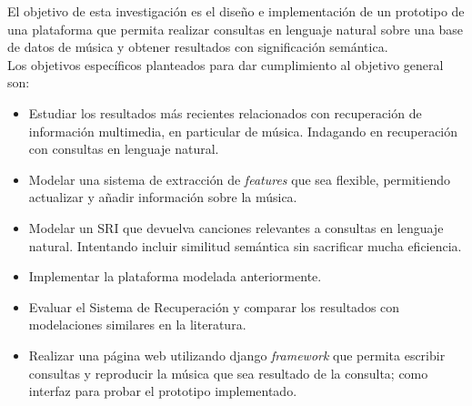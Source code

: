 El objetivo de esta investigación es el diseño e implementación de un prototipo de una plataforma que permita realizar consultas en lenguaje natural sobre una base de datos de música y obtener resultados con significación semántica.\\
Los objetivos específicos planteados para dar cumplimiento al objetivo general son:
\begin{itemize}
    \item Estudiar los resultados más recientes relacionados con recuperación de información multimedia, en particular de música. Indagando en recuperación con consultas en lenguaje natural.
    \item Modelar una sistema de extracción de \textit{features} que sea flexible, permitiendo actualizar y añadir información sobre la música.
    \item Modelar un SRI que devuelva canciones relevantes a consultas en lenguaje natural. Intentando incluir similitud semántica sin sacrificar mucha eficiencia.
    \item Implementar la plataforma modelada anteriormente.
    \item Evaluar el Sistema de Recuperación y comparar los resultados con modelaciones similares en la literatura.
    \item Realizar una página web utilizando django \textit{framework} que permita escribir consultas y reproducir la música que sea resultado de la consulta; como interfaz para probar el prototipo implementado.
\end{itemize}

